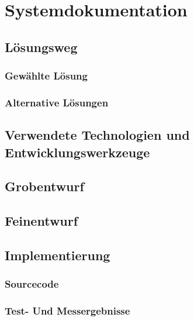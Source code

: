 \chapter{Systemdokumentation}

\section{Lösungsweg}

\subsection{Gewählte Lösung}

\subsection{Alternative Lösungen}

\section[Technologien]{Verwendete Technologien und Entwicklungswerkzeuge}





\section{Grobentwurf}

\section{Feinentwurf}

\section{Implementierung}

\subsection{Sourcecode}

\subsection{Test- Und Messergebnisse}
